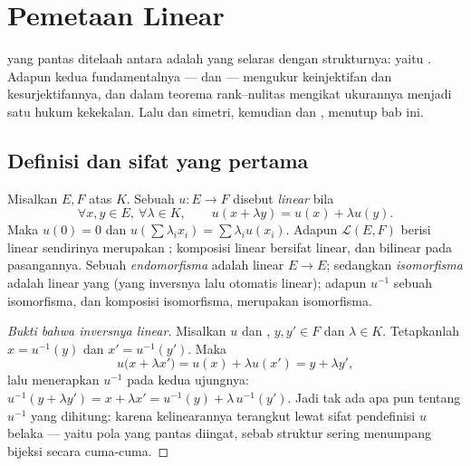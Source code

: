 \chapter{Pemetaan Linear}\label{ch:b1:linmaps}

 yang pantas ditelaah antara  adalah yang selaras
dengan strukturnya: yaitu \emph{}. Adapun kedua
 fundamentalnya ---  dan  --- mengukur keinjektifan dan
kesurjektifannya, dan dalam  teorema rank--nulitas
mengikat ukurannya menjadi satu hukum kekekalan. Lalu  dan
simetri, kemudian  dan , menutup bab ini.

\section{Definisi dan sifat yang pertama}

\begin{definition}\label{def:b1:linmaps:def}
Misalkan $E, F$  atas $K$. Sebuah  $u \colon E \to F$ disebut
\emph{linear} bila
\[
\forall x, y \in E,\ \forall \lambda \in K, \qquad
u(x + \lambda y) = u(x) + \lambda u(y).
\]
Maka $u(0) = 0$ dan $u(\sum \lambda_i x_i) = \sum \lambda_i u(x_i)$.
Adapun  $\mathcal{L}(E, F)$ berisi  linear sendirinya merupakan ;
komposisi  linear bersifat linear, dan bilinear pada pasangannya. Sebuah
\emph{endomorfisma} adalah  linear $E \to E$; sedangkan \emph{isomorfisma} adalah
 linear yang  (yang inversnya lalu otomatis linear);
adapun $u^{-1}$ sebuah isomorfisma, dan komposisi isomorfisma, merupakan
isomorfisma.
\end{definition}

\begin{proof}[Bukti bahwa inversnya linear]
Misalkan $u$  dan , $y, y' \in F$ dan $\lambda \in K$.
Tetapkanlah $x = u^{-1}(y)$ dan $x' = u^{-1}(y')$. Maka
\[
u\bigl(x + \lambda x'\bigr) = u(x) + \lambda u(x')
= y + \lambda y' ,
\]
lalu menerapkan $u^{-1}$ pada kedua ujungnya: $u^{-1}(y + \lambda y') = x
+ \lambda x' = u^{-1}(y) + \lambda\,u^{-1}(y')$. Jadi tak ada apa pun tentang
$u^{-1}$ yang dihitung: karena kelinearannya terangkut lewat
sifat pendefinisi $u$ belaka --- yaitu pola yang pantas diingat,
sebab struktur sering menumpang bijeksi secara cuma-cuma.
\end{proof}

